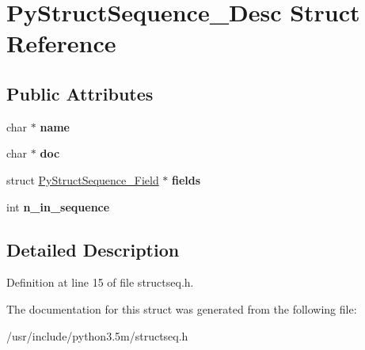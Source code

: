 \hypertarget{structPyStructSequence__Desc}{}\section{Py\+Struct\+Sequence\+\_\+\+Desc Struct Reference}
\label{structPyStructSequence__Desc}
\subsection*{Public Attributes}
\begin{DoxyCompactItemize}
\item 
char $\ast$ {\bfseries name}\hypertarget{structPyStructSequence__Desc_ae3d6a21652f0c9e62670e79ddad60045}{}\label{structPyStructSequence__Desc_ae3d6a21652f0c9e62670e79ddad60045}

\item 
char $\ast$ {\bfseries doc}\hypertarget{structPyStructSequence__Desc_a96a9c56395cf81931030bbb69a1ce504}{}\label{structPyStructSequence__Desc_a96a9c56395cf81931030bbb69a1ce504}

\item 
struct \hyperlink{structPyStructSequence__Field}{Py\+Struct\+Sequence\+\_\+\+Field} $\ast$ {\bfseries fields}\hypertarget{structPyStructSequence__Desc_a072f27b442529f33fb31732eda6b315c}{}\label{structPyStructSequence__Desc_a072f27b442529f33fb31732eda6b315c}

\item 
int {\bfseries n\+\_\+in\+\_\+sequence}\hypertarget{structPyStructSequence__Desc_a8a294c7934e6ac8ee4ad5cf0d1496d28}{}\label{structPyStructSequence__Desc_a8a294c7934e6ac8ee4ad5cf0d1496d28}

\end{DoxyCompactItemize}


\subsection{Detailed Description}


Definition at line 15 of file structseq.\+h.



The documentation for this struct was generated from the following file\+:\begin{DoxyCompactItemize}
\item 
/usr/include/python3.\+5m/structseq.\+h\end{DoxyCompactItemize}
